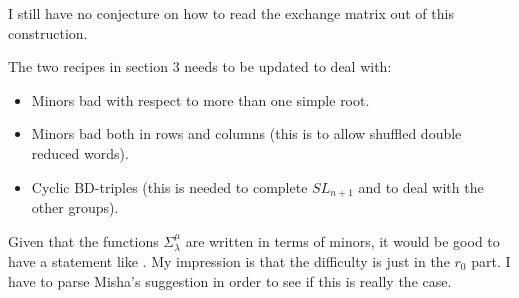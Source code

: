 \documentclass[a4paper]{amsart}
\theoremstyle{definition}
\begin{document}
I still have no conjecture on how to read the exchange matrix out of this construction.

The two recipes in section 3 needs to be updated to deal with:
\begin{itemize}
  \item
    Minors bad with respect to more than one simple root.
  \item
    Minors bad both in rows and columns (this is to allow shuffled double reduced words).
  \item
    Cyclic BD-triples (this is needed to complete $SL_{n+1}$ and to deal with the other groups).
\end{itemize}

Given that the functions $\Sigma_\lambda^\mu$ are written in terms of minors, it would be good to have a statement like \cite[Corollary 4.21]{GSV10}.
My impression is that the difficulty is just in the $r_0$ part.
I have to parse Misha's suggestion in order to see if this is really the case.




\end{document}
